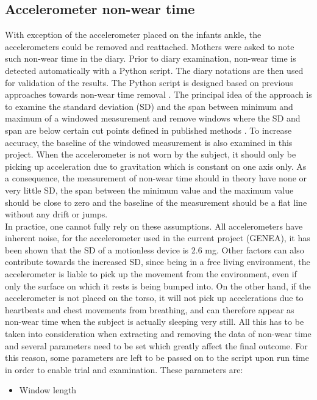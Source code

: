 \documentclass{article}
\begin{document}
{\subsection{Accelerometer non-wear time}
With exception of the accelerometer placed on the infants ankle, the accelerometers could be removed and reattached. Mothers were asked to note such non-wear time in the diary. Prior to diary examination, non-wear time is detected automatically with a Python script. The diary notations are then used for validation of the results. The Python script is designed based on previous approaches towards non-wear time removal \cite{ref2}. The principal idea of the approach is to examine the standard deviation (SD) and the span between minimum and maximum of a windowed measurement and remove windows where the SD and span are below certain cut points defined in published methods \cite{ref2}. To increase accuracy, the baseline of the windowed measurement is also examined in this project. When the accelerometer is not worn by the subject, it should only be picking up acceleration due to gravitation which is constant on one axis only. As a consequence, the measurement of non-wear time should in theory have none or very little SD, the span between the minimum value and the maximum value should be close to zero and the baseline of the measurement should be a flat line without any drift or jumps.\\In practice, one cannot fully rely on these assumptions. All accelerometers have inherent noise, for the accelerometer used in the current project (GENEA), it has been shown that the SD of a motionless device is 2.6 mg. Other factors can also contribute towards the increased SD, since being in a free living environment, the accelerometer is liable to pick up the movement from the environment, even if only the surface on which it rests is being bumped into. On the other hand, if the accelerometer is not placed on the torso, it will not pick up accelerations due to heartbeats and chest movements from breathing\cite{ref8}, and can therefore appear as non-wear time when the subject is actually sleeping very still. All this has to be taken into consideration when extracting and removing the data of non-wear time and several parameters need to be set which greatly affect the final outcome. For this reason, some parameters are left to be passed on to the script upon run time in order to enable trial and examination. These parameters are: 
\begin{itemize}
\item Window length

\end{itemize}}
\end{document}
